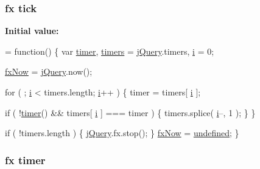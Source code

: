 \hypertarget{jquery-1_89_81_8js_a4820e1fd61053b39dd3bbd8cac9f48ba}{
\subsubsection[{tick}]{ {\bf fx} tick}}\label{jquery-1_89_81_8js_a4820e1fd61053b39dd3bbd8cac9f48ba}
{\bfseries Initial value\+:}
\begin{DoxyCode}
= \textcolor{keyword}{function}() \{
    var \hyperlink{jquery-1_89_81_8js_a2b44b4db680ed005831a801cef9f8bb3}{timer},
        \hyperlink{jquery-1_89_81_8js_a90bf6571856437dc2269be68a12c1d5a}{timers} = \hyperlink{jquery-1_89_81_8js_add5237586d970a38a81f990e8eb28c6c}{jQuery}.timers,
        \hyperlink{core_8constructor_8js_a5e25b1d1bed9ab5f3174b76d6a722180}{i} = 0;

    \hyperlink{jquery-1_89_81_8js_a008b3271e2f410e89917bc6d96096296}{fxNow} = \hyperlink{jquery-1_89_81_8js_add5237586d970a38a81f990e8eb28c6c}{jQuery}.now();

    \textcolor{keywordflow}{for} ( ; \hyperlink{core_8constructor_8js_a5e25b1d1bed9ab5f3174b76d6a722180}{i} < timers.length; \hyperlink{core_8constructor_8js_a5e25b1d1bed9ab5f3174b76d6a722180}{i}++ ) \{
        timer = timers[ \hyperlink{core_8constructor_8js_a5e25b1d1bed9ab5f3174b76d6a722180}{i} ];
        
        \textcolor{keywordflow}{if} ( !\hyperlink{jquery-1_89_81_8js_a2b44b4db680ed005831a801cef9f8bb3}{timer}() && timers[ \hyperlink{core_8constructor_8js_a5e25b1d1bed9ab5f3174b76d6a722180}{i} ] === timer ) \{
            timers.splice( \hyperlink{core_8constructor_8js_a5e25b1d1bed9ab5f3174b76d6a722180}{i}--, 1 );
        \}
    \}

    \textcolor{keywordflow}{if} ( !timers.length ) \{
        \hyperlink{jquery-1_89_81_8js_add5237586d970a38a81f990e8eb28c6c}{jQuery}.fx.stop();
    \}
    \hyperlink{jquery-1_89_81_8js_a008b3271e2f410e89917bc6d96096296}{fxNow} = \hyperlink{jquery-1_89_81_8js_a08113a236cc18d2a9d5ce27e638012be}{undefined};
\}
\end{DoxyCode}
\hypertarget{jquery-1_89_81_8js_a2b44b4db680ed005831a801cef9f8bb3}{
\subsubsection[{timer}]{ {\bf fx} timer}}\label{jquery-1_89_81_8js_a2b44b4db680ed005831a801cef9f8bb3}
